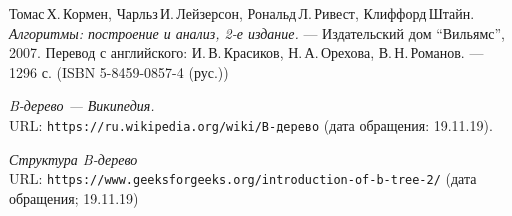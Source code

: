 \begin{thebibliography}{99}

Томас\,Х.\,Кормен, Чарльз\,И.\,Лейзерсон, Рональд\,Л.\,Ривест, Клиффорд\,Штайн.
{\itshape Алгоритмы: построение и анализ, 2-е издание.} --- Издательский дом \enquote{Вильямс}, 2007. Перевод с английского: И.\,В.\,Красиков, Н.\,А.\,Орехова, В.\,Н.\,Романов. --- 1296 с. (ISBN 5-8459-0857-4 (рус.))

{\itshape B-дерево — Википедия.} \\URL: \texttt{https://ru.wikipedia.org/wiki/B-дерево} (дата обращения: 19.11.19).

{\itshape Структура B-дерево} \\URL: \texttt{https://www.geeksforgeeks.org/introduction-of-b-tree-2/} (дата обращения; 19.11.19)

\end{thebibliography}
\pagebreak